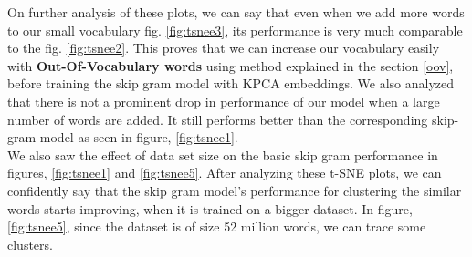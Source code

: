 On further analysis of these plots, we can say that even when we add more words to our small vocabulary fig. \ref{fig:tsnee3}, its performance is very much comparable to the fig. \ref{fig:tsnee2}. This proves that we can increase our vocabulary easily with \textbf{Out-Of-Vocabulary words} using method explained in the section \ref{oov}, before training the skip gram model with KPCA embeddings. We also analyzed that there is not a prominent drop in performance of our model when a large number of words are added. It still performs better than the corresponding skip-gram model as seen in figure, \ref{fig:tsnee1}. \\
We also saw the effect of data set size on the basic skip gram performance in figures, \ref{fig:tsnee1} and \ref{fig:tsnee5}. After analyzing these t-SNE plots, we can confidently say that the skip gram model's performance for clustering the similar words starts improving, when it is trained on a bigger dataset. In figure, \ref{fig:tsnee5}, since the dataset is of size 52 million words, we can trace some clusters.
